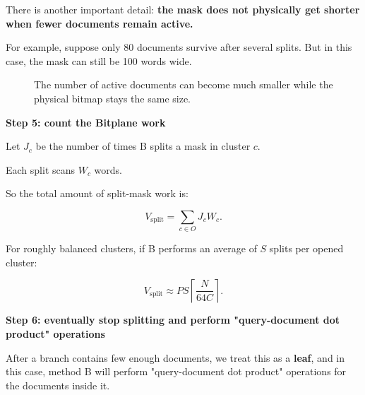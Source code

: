 There is another important detail: \textbf{the mask does not physically get shorter when fewer documents remain active.}

For example, suppose only 80 documents survive after several splits. But in this case, the mask can still be 100 words wide.


\begin{figure}[htbp]
\centering
{}
\caption{The number of active documents can become much smaller while the physical bitmap stays the same size.}
\end{figure}

\pagebreak  





\textbf{Step 5: count the Bitplane work}\par

Let \(J_c\) be the number of times B splits a mask in cluster \(c\).

Each split scans \(W_c\) words.

So the total amount of split-mask work is:

\[
\boxed{
V_{\text{split}}
=
\sum_{c\in O}J_cW_c.
}
\]

For roughly balanced clusters, if B performs an average of \(S\) splits per opened cluster:

\[
V_{\text{split}}
\approx
PS
\left\lceil
\frac{N}{64C}
\right\rceil.
\]



\textbf{Step 6: eventually stop splitting and perform "query-document dot product" operations}\par

After a branch contains few enough documents, we treat this as a \textbf{leaf}, and in this case, method B will perform "query-document dot product" operations for the documents inside it.

